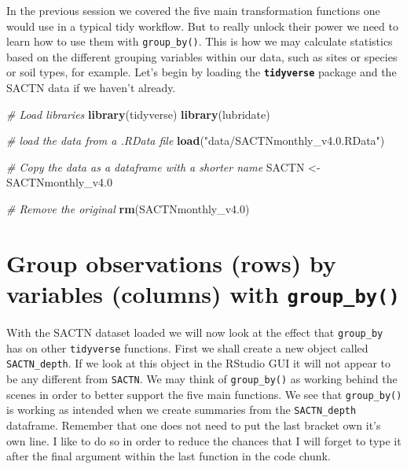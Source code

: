 \documentclass[
]{book}
\newenvironment{Shaded}{\begin{snugshade}}{\end{snugshade}}
\newcommand{\CommentTok}[1]{\textcolor[rgb]{0.56,0.35,0.01}{\textit{#1}}}
\newcommand{\FloatTok}[1]{\textcolor[rgb]{0.00,0.00,0.81}{#1}}
\newcommand{\KeywordTok}[1]{\textcolor[rgb]{0.13,0.29,0.53}{\textbf{#1}}}
\newcommand{\NormalTok}[1]{#1}
\newcommand{\StringTok}[1]{\textcolor[rgb]{0.31,0.60,0.02}{#1}}
\begin{document}
In the previous session we covered the five main transformation functions one would use in a typical tidy workflow. But to really unlock their power we need to learn how to use them with \texttt{group\_by()}. This is how we may calculate statistics based on the different grouping variables within our data, such as sites or species or soil types, for example. Let's begin by loading the \textbf{\texttt{tidyverse}} package and the SACTN data if we haven't already.

\begin{Shaded}
\begin{Highlighting}[]
\CommentTok{\# Load libraries}
\KeywordTok{library}\NormalTok{(tidyverse)}
\KeywordTok{library}\NormalTok{(lubridate)}

\CommentTok{\# load the data from a .RData file}
\KeywordTok{load}\NormalTok{(}\StringTok{"data/SACTNmonthly\_v4.0.RData"}\NormalTok{)}

\CommentTok{\# Copy the data as a dataframe with a shorter name}
\NormalTok{SACTN <{-}}\StringTok{ }\NormalTok{SACTNmonthly\_v4}\FloatTok{.0}

\CommentTok{\# Remove the original}
\KeywordTok{rm}\NormalTok{(SACTNmonthly\_v4}\FloatTok{.0}\NormalTok{)}
\end{Highlighting}
\end{Shaded}

\hypertarget{group-observations-rows-by-variables-columns-with-group_by}{%
\section{\texorpdfstring{Group observations (rows) by variables (columns) with \texttt{group\_by()}}{Group observations (rows) by variables (columns) with group\_by()}}\label{group-observations-rows-by-variables-columns-with-group_by}}

With the SACTN dataset loaded we will now look at the effect that \texttt{group\_by} has on other \texttt{tidyverse} functions. First we shall create a new object called \texttt{SACTN\_depth}. If we look at this object in the RStudio GUI it will not appear to be any different from \texttt{SACTN}. We may think of \texttt{group\_by()} as working behind the scenes in order to better support the five main functions. We see that \texttt{group\_by()} is working as intended when we create summaries from the \texttt{SACTN\_depth} dataframe. Remember that one does not need to put the last bracket own it's own line. I like to do so in order to reduce the chances that I will forget to type it after the final argument within the last function in the code chunk.
\end{document}
